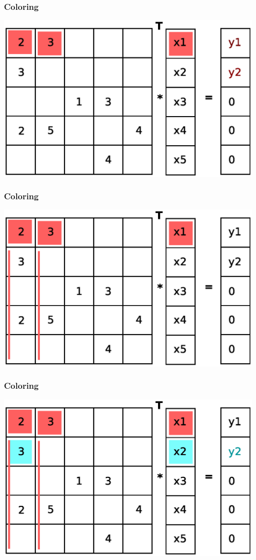 \documentclass{beamer}
\begin{document}
\begin{frame}
\frametitle{Coloring}
\includegraphics[width=0.8\linewidth]{graphic/coloringT4.eps}
\end{frame}

\begin{frame}
\frametitle{Coloring}
\includegraphics[width=0.8\linewidth]{graphic/coloringT5.eps}
\end{frame}

\begin{frame}
\frametitle{Coloring}
\includegraphics[width=0.8\linewidth]{graphic/coloringT6.eps}
\end{frame}
\end{document}
